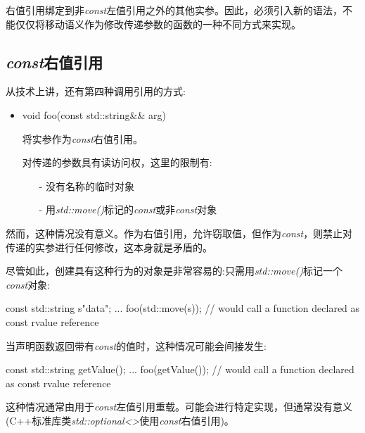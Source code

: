 右值引用绑定到非\textit{const}左值引用之外的其他实参。因此，必须引入新的语法，不能仅仅将移动语义作为修改传递参数的函数的一种不同方式来实现。

\subsection{\textit{const}右值引用}

从技术上讲，还有第四种调用引用的方式:

\begin{itemize}
	\item \begin{cppcode}
void foo(const std::string\&\& arg)
\end{cppcode}
	将实参作为\textit{const}右值引用。

	对传递的参数具有读访问权，这里的限制有:
	\begin{itemize}
		\item[-] 没有名称的临时对象
		\item[-] 用\textit{std::move()}标记的\textit{const}或非\textit{const}对象
	\end{itemize}
\end{itemize}

然而，这种情况没有意义。作为右值引用，允许窃取值，但作为\textit{const}，则禁止对传递的实参进行任何修改，这本身就是矛盾的。

尽管如此，创建具有这种行为的对象是非常容易的:只需用\textit{std::move()}标记一个\textit{const}对象:

\begin{cppcode}
const std::string s{"data"};
...
foo(std::move(s)); // would call a function declared as const rvalue reference
\end{cppcode}

当声明函数返回带有\textit{const}的值时，这种情况可能会间接发生:

\begin{cppcode}
const std::string getValue();
...
foo(getValue()); // would call a function declared as const rvalue reference
\end{cppcode}

这种情况通常由用于\textit{const}左值引用重载。可能会进行特定实现，但通常没有意义(C++标准库类\textit{std::optional<>}使用\textit{const}右值引用)。




















































